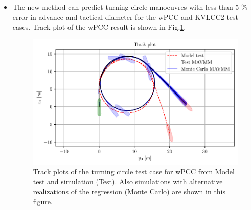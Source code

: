 \begin{itemize}
    \item The new method can predict turning circle manoeuvres with less than 5 \% error in advance and tactical diameter for the wPCC and KVLCC2 test cases. Track plot of the wPCC result is shown in Fig.\ref{fig:turning_circle_wpcc}.
    \begin{figure}[h]
    \centering
    \includegraphics{kappa/images/10.pdf}
    \caption{Track plots of the turning circle test case for wPCC from Model test and simulation (Test). Also simulations with alternative realizations of the regression (Monte Carlo) are shown in this figure.}
    \label{fig:turning_circle_wpcc}
    \end{figure}
    
\end{itemize}






